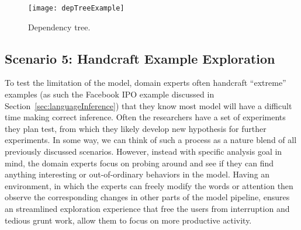 \begin{figure*}[t]
\centering
\vspace{-2mm}
 \texttt{[image: depTreeExample]}
 \caption{
Dependency tree.
 }
\label{fig:depTreeExample}
\end{figure*}

\subsection{Scenario 5: Handcraft Example Exploration}
To test the limitation of the model, domain experts often handcraft ``extreme'' examples (as such the Facebook IPO example discussed in Section~\ref{sec:languageInference}) that they know most model will have a difficult time making correct inference.
%
Often the researchers have a set of experiments they plan test, from which they likely develop new hypothesis for further experiments.
%
In some way, we can think of such a process as a nature blend of all previously discussed scenarios. However,  instead with specific analysis goal in mind, the domain experts focus on probing around and see if they can find anything interesting or out-of-ordinary behaviors in the model.
%
Having an environment, in which the experts can freely modify the words or attention then observe the corresponding changes in other parts of the model pipeline, ensures an streamlined exploration experience that free the users from interruption and tedious grunt work, allow them to focus on more productive activity.

